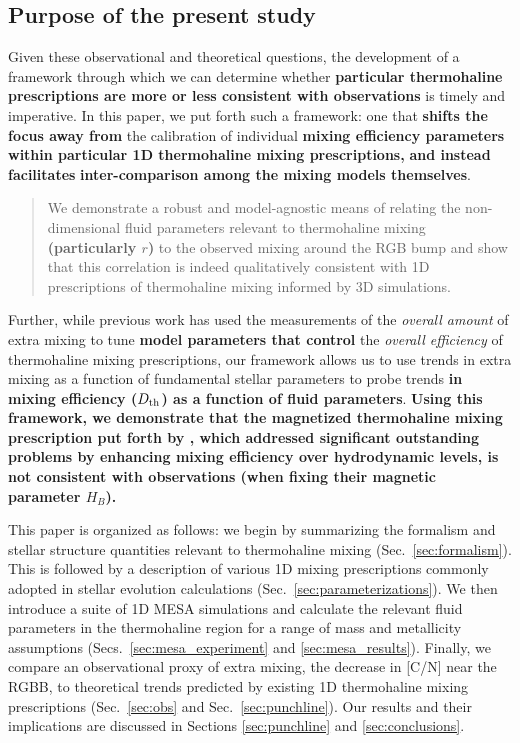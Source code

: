 \subsection{Purpose of the present study}
%
Given these observational and theoretical questions, the development of a framework through which we can determine whether \textbf{particular thermohaline prescriptions are more or less consistent with observations} %
is timely and imperative. 
In this paper, we put forth such a framework: one that 
\textbf{shifts the focus away from}
the calibration of individual \textbf{mixing efficiency parameters within particular 1D thermohaline mixing prescriptions,} \textbf{and instead facilitates} \textbf{inter-comparison among the mixing models themselves}. 
\begin{quote}
We demonstrate a robust and model-agnostic means of relating the non-dimensional fluid parameters relevant to thermohaline mixing \textbf{(particularly $r$)} to the observed mixing around the RGB bump and show that this correlation is indeed qualitatively consistent with 1D prescriptions of thermohaline mixing informed by 3D simulations. 
\end{quote}
Further, while previous work \citep[e.g.][]{charbonnel_thermohaline_2007} has used the measurements of the \textit{overall amount} of extra mixing to tune \textbf{model parameters that control} the \textit{overall efficiency} of thermohaline mixing prescriptions, our framework allows us to use trends in extra mixing as a function of fundamental stellar parameters to probe trends \textbf{in mixing efficiency ($D_\mathrm{th}$) as a function of fluid parameters}.
\textbf{Using this framework, we demonstrate that the magnetized thermohaline mixing prescription put forth by \citet{harrington}, which addressed significant outstanding problems by enhancing mixing efficiency over hydrodynamic levels, is not consistent with observations (when fixing their magnetic parameter $H_B$).}

This paper is organized as follows: we begin by summarizing the formalism and stellar structure quantities relevant to thermohaline mixing (Sec.~\ref{sec:formalism}). This is followed by a description of various 1D mixing prescriptions commonly adopted in stellar evolution calculations (Sec.~\ref{sec:parameterizations}). We then introduce a suite of 1D MESA simulations and calculate the relevant fluid parameters in the thermohaline region for a range of mass and metallicity assumptions (Secs.~\ref{sec:mesa_experiment} and \ref{sec:mesa_results}). Finally, we compare an observational proxy of extra mixing, the decrease in [C/N] near the RGBB, to theoretical trends predicted by existing 1D thermohaline mixing prescriptions (Sec.~\ref{sec:obs} and Sec.~\ref{sec:punchline}). Our results and their implications are discussed in Sections \ref{sec:punchline} and \ref{sec:conclusions}. 